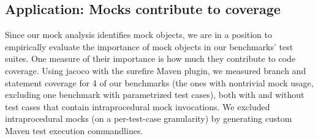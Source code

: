 %
%

\subsection{Application: Mocks contribute to coverage} Since our mock analysis identifies mock objects, we are in a position to empirically evaluate the importance of mock objects in our benchmarks' test suites. One measure of their importance is how much they contribute to code coverage. Using jacoco with the surefire Maven plugin, we measured branch and statement coverage for 4 of our benchmarks (the ones with nontrivial mock usage, excluding one benchmark with parametrized test cases), both with and without test cases that contain intraprocedural mock invocations. We excluded intraprocedural mocks (on a per-test-case granularity) by generating custom Maven test execution commandlines.

